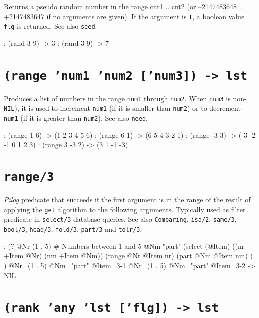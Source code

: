 Returns a pseudo random number in the range cnt1 .. cnt2 (or
--2147483648 .. +2147483647 if no arguments are given). If the argument
is \texttt{T}, a boolean value \texttt{flg} is returned. See also \texttt{seed}.


\begin{wideverbatim}
: (rand 3 9)
-> 3
: (rand 3 9)
-> 7
\end{wideverbatim}

 
\section*{\texttt{(range 'num1 'num2 ['num3]) -> lst}}
\label{sec:func-ref-R-(range 'num1 'num2 ['num3]) -> lst}


Produces a list of numbers in the range \texttt{num1} through \texttt{num2}. When
\texttt{num3} is non-\texttt{NIL}), it is used to increment \texttt{num1} (if it is smaller
than \texttt{num2}) or to decrement \texttt{num1} (if it is greater than \texttt{num2}). See
also \texttt{need}.


\begin{wideverbatim}
: (range 1 6)
-> (1 2 3 4 5 6)
: (range 6 1)
-> (6 5 4 3 2 1)
: (range -3 3)
-> (-3 -2 -1 0 1 2 3)
: (range 3 -3 2)
-> (3 1 -1 -3)
\end{wideverbatim}

 
\section*{\texttt{range/3}}
\label{sec:func-ref-R-range/3}


\emph{Pilog} predicate that succeeds if the first argument
is in the range of the result of applying the \texttt{get} algorithm to the
following arguments. Typically used as filter predicate in \texttt{select/3}
database queries. See also \texttt{Comparing}, \texttt{isa/2}, \texttt{same/3}, \texttt{bool/3},
\texttt{head/3}, \texttt{fold/3}, \texttt{part/3} and \texttt{tolr/3}.


\begin{wideverbatim}
: (?
   @Nr (1 . 5)  # Numbers between 1 and 5
   @Nm "part"
   (select (@Item)
      ((nr +Item @Nr) (nm +Item @Nm))
      (range @Nr @Item nr)
      (part @Nm @Item nm) ) )
 @Nr=(1 . 5) @Nm="part" @Item={3-1}                                              @Nr=(1 . 5) @Nm="part" @Item={3-2}
-> NIL
\end{wideverbatim}

 
\section*{\texttt{(rank 'any 'lst ['flg]) -> lst}}
\label{sec:func-ref-R-(rank 'any 'lst ['flg]) -> lst}


